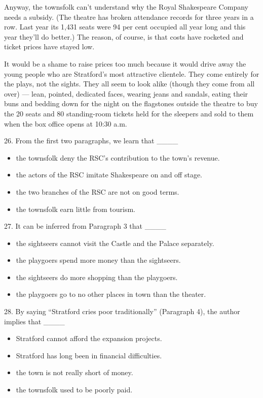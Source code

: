\documentclass[UTF8,11pt]{ctexart}
\begin{document}
Anyway, the townsfolk can’t understand why the Royal Shakespeare Company needs a subsidy. (The theatre has broken attendance records for three years in a row. Last year its 1,431 seats were 94 per cent occupied all year long and this year they’ll do better.) The reason, of course, is that costs have rocketed and ticket prices have stayed low.


It would be a shame to raise prices too much because it would drive away the young people who are Stratford’s most attractive clientele. They come entirely for the plays, not the sights. They all seem to look alike (though they come from all over) — lean, pointed, dedicated faces, wearing jeans and sandals, eating their buns and bedding down for the night on the flagstones outside the theatre to buy the 20 seats and 80 standing-room tickets held for the sleepers and sold to them when the box office opens at 10:30 a.m.


26. From the first two paragraphs, we learn that \_\_\_\_


\begin{itemize}[leftmargin=2em,itemsep=.2em,topsep=.4em]\item[A.] the townsfolk deny the RSC’s contribution to the town’s revenue.
\item[B.] the actors of the RSC imitate Shakespeare on and off stage.
\item[C.] the two branches of the RSC are not on good terms.
\item[D.] the townsfolk earn little from tourism.
\end{itemize}

27. It can be inferred from Paragraph 3 that \_\_\_\_


\begin{itemize}[leftmargin=2em,itemsep=.2em,topsep=.4em]\item[A.] the sightseers cannot visit the Castle and the Palace separately.
\item[B.] the playgoers spend more money than the sightseers.
\item[C.] the sightseers do more shopping than the playgoers.
\item[D.] the playgoers go to no other places in town than the theater.
\end{itemize}

28. By saying “Stratford cries poor traditionally” (Paragraph 4), the author implies that \_\_\_\_


\begin{itemize}[leftmargin=2em,itemsep=.2em,topsep=.4em]\item[A.] Stratford cannot afford the expansion projects.
\item[B.] Stratford has long been in financial difficulties.
\item[C.] the town is not really short of money.
\item[D.] the townsfolk used to be poorly paid.
\end{itemize}
\end{document}

